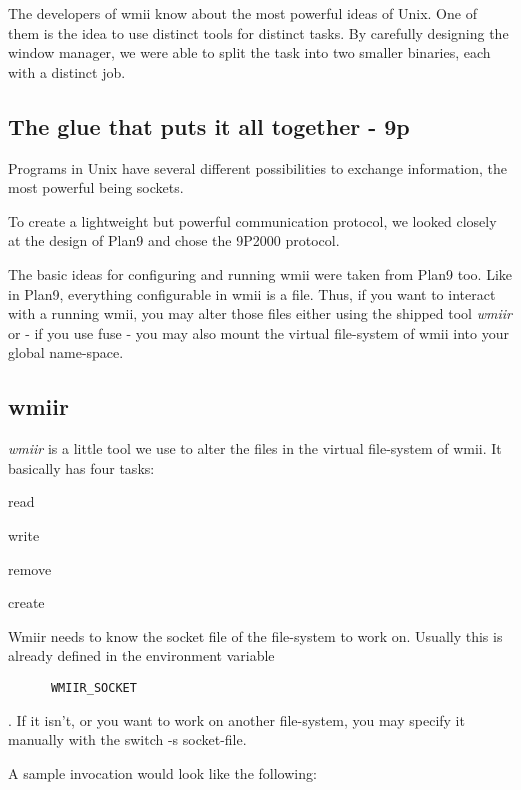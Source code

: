 \documentclass[12pt,a4paper]{article}
\newenvironment{itemize*}
  {\begin{itemize}
      \setlength{\itemsep}{0pt}
      \setlength{\parskip}{0pt}}
  {\end{itemize}}
\begin{document}
    The developers of wmii know about the most powerful ideas of
    Unix. One of them is the idea to use distinct tools for distinct
    tasks. By carefully designing the window manager, we were able to
    split the task into two smaller binaries, each with a distinct
    job.
  
  \subsection{The glue that puts it all together - 9p}

    Programs in Unix have several different possibilities to exchange
    information, the most powerful being sockets.

    To create a lightweight but powerful communication protocol, we
    looked closely at the design of Plan9 and chose the 9P2000
    protocol.

    The basic ideas for configuring and running wmii were taken from
    Plan9 too. Like in Plan9, everything configurable in wmii is a
    file. Thus, if you want to interact with a running wmii, you may
    alter those files either using the shipped tool \emph{wmiir} or -
    if you use fuse - you may also mount the virtual file-system of
    wmii into your global name-space.
  
  \subsection{wmiir}

    \emph{wmiir} is a little tool we use to alter the files in the
    virtual file-system of wmii. It basically has four tasks:

    \begin{itemize*}
    \item read
    \item write
    \item remove
    \item create
    \end{itemize*}

    Wmiir needs to know the socket file of the file-system to work
    on. Usually this is already defined in the environment variable
    \begin{verbatim}
      WMIIR_SOCKET
    \end{verbatim}. If it isn't, or you want to work on another
    file-system, you may specify it manually with the switch -s
    socket-file.

    A sample invocation would look like the following:
\end{document}
